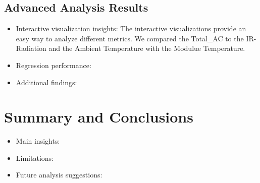 \documentclass[10pt]{article}
\begin{document}
\subsection{Advanced Analysis Results}
\begin{itemize}
    \item Interactive visualization insights: The interactive visualizations provide an easy way to analyze different metrics. We compared the Total\_AC to the IR-Radiation and the Ambient Temperature with the Modulue Temperature.
    \item Regression performance:
    \item Additional findings:
\end{itemize}

\section{Summary and Conclusions}
\begin{itemize}
    \item Main insights:
    \item Limitations:
    \item Future analysis suggestions:
\end{itemize}

\end{document}
